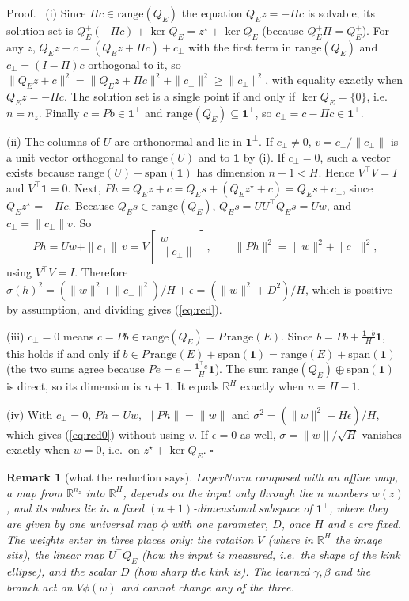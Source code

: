 \documentclass[11pt]{article}
\theoremstyle{plainnote}
\newtheorem{remark}{Remark}
\renewenvironment{proof}[1][Proof]{\par\noindent #1.\ }{\hfill$\square$\par}
\newcommand{\R}{\mathbb R}
\newcommand{\one}{\mathbf 1}
\newcommand{\cp}{c_\perp}
\begin{document}
\begin{proof}
(i) Since $\Pi c\in\mathrm{range}(Q_E)$ the equation $Q_Ez=-\Pi c$ is solvable; its solution set is $Q_E^+(-\Pi c)+\ker Q_E=z^\star+\ker Q_E$ (because $Q_E^+\Pi=Q_E^+$). For any $z$, $Q_Ez+c=(Q_Ez+\Pi c)+\cp$ with the first term in $\mathrm{range}(Q_E)$ and $\cp=(I-\Pi)c$ orthogonal to it, so $\|Q_Ez+c\|^2=\|Q_Ez+\Pi c\|^2+\|\cp\|^2\ge\|\cp\|^2$, with equality exactly when $Q_Ez=-\Pi c$. The solution set is a single point if and only if $\ker Q_E=\{0\}$, i.e.\ $n=n_z$. Finally $c=Pb\in\one^\perp$ and $\mathrm{range}(Q_E)\subseteq\one^\perp$, so $\cp=c-\Pi c\in\one^\perp$.

(ii) The columns of $U$ are orthonormal and lie in $\one^\perp$. If $\cp\ne0$, $v=\cp/\|\cp\|$ is a unit vector orthogonal to $\mathrm{range}(U)$ and to $\one$ by (i). If $\cp=0$, such a vector exists because $\mathrm{range}(U)+\mathrm{span}(\one)$ has dimension $n+1<H$. Hence $V^\top V=I$ and $V^\top\one=0$. Next, $Ph=Q_Ez+c=Q_Es+(Q_Ez^\star+c)=Q_Es+\cp$, since $Q_Ez^\star=-\Pi c$. Because $Q_Es\in\mathrm{range}(Q_E)$, $Q_Es=UU^\top Q_Es=Uw$, and $\cp=\|\cp\|v$. So
\[
Ph=Uw+\|\cp\|\,v=V\begin{bmatrix}w\\ \|\cp\|\end{bmatrix},\qquad \|Ph\|^2=\|w\|^2+\|\cp\|^2,
\]
using $V^\top V=I$. Therefore $\sigma(h)^2=(\|w\|^2+\|\cp\|^2)/H+\epsilon=(\|w\|^2+D^2)/H$, which is positive by assumption, and dividing gives (\ref{eq:red}).

(iii) $\cp=0$ means $c=Pb\in\mathrm{range}(Q_E)=P\,\mathrm{range}(E)$. Since $b=Pb+\frac{\one^\top b}{H}\one$, this holds if and only if $b\in P\,\mathrm{range}(E)+\mathrm{span}(\one)=\mathrm{range}(E)+\mathrm{span}(\one)$ (the two sums agree because $Pe=e-\frac{\one^\top e}{H}\one$). The sum $\mathrm{range}(Q_E)\oplus\mathrm{span}(\one)$ is direct, so its dimension is $n+1$. It equals $\R^H$ exactly when $n=H-1$.

(iv) With $\cp=0$, $Ph=Uw$, $\|Ph\|=\|w\|$ and $\sigma^2=(\|w\|^2+H\epsilon)/H$, which gives (\ref{eq:red0}) without using $v$. If $\epsilon=0$ as well, $\sigma=\|w\|/\sqrt H$ vanishes exactly when $w=0$, i.e.\ on $z^\star+\ker Q_E$.
\end{proof}

\begin{remark}[what the reduction says]
LayerNorm composed with an affine map, a map from $\R^{n_z}$ into $\R^H$, depends on the input only through the $n$ numbers $w(z)$, and its values lie in a fixed $(n+1)$-dimensional subspace of $\one^\perp$, where they are given by one universal map $\phi$ with one parameter, $D$, once $H$ and $\epsilon$ are fixed. The weights enter in three places only: the rotation $V$ (where in $\R^H$ the image sits), the linear map $U^\top Q_E$ (how the input is measured, i.e.\ the shape of the kink ellipse), and the scalar $D$ (how sharp the kink is). The learned $\gamma,\beta$ and the branch act on $V\phi(w)$ and cannot change any of the three.
\end{remark}
\end{document}
